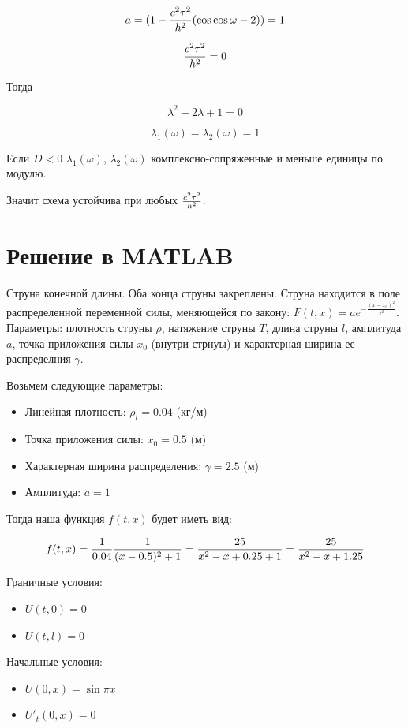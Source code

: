 \documentclass[a4paper]{article}
\begin{document}
$$a = (1-{c^2\tau^2 \over h^2}(\cos{\cos{\omega}}-2)) = 1$$

$${c^2\tau^2 \over h^2} = 0$$

Тогда

$$\lambda^2 - 2\lambda + 1 = 0$$

$$\lambda_1(\omega) = \lambda_2(\omega) = 1$$

Если $D<0$ $\lambda_1(\omega)$, $\lambda_2(\omega)$ комплексно-сопряженные и меньше единицы по модулю.

Значит схема устойчива при любых ${c^2\tau^2 \over h^2}$.

\newpage

\section{Решение в MATLAB}

Струна конечной длины. Оба конца струны закреплены. Струна находится в поле распределенной переменной силы, меняющейся по закону: $F(t, x) = ae^{-\frac{(x-x_0)^2}{\gamma^2}}$. \\
Параметры: плотность струны $\rho$, натяжение струны $T$, длина струны $l$, амплитуда $a$, точка приложения силы $x_0$ (внутри стрнуы) и характерная ширина ее распределния $\gamma$.

Возьмем следующие параметры:
\begin{itemize}
    \item Линейная плотность: $\rho_l=0.04$ (кг/м)
    \item Точка приложения силы: $x_0=0.5$ (м)
    \item Характерная ширина распределения: $\gamma=2.5$ (м)
    \item Амплитуда: $a=1$
\end{itemize}

Тогда  наша функция $f(t,x)$ будет иметь вид:

$$f(t,x)={1 \over 0.04}{1 \over (x-0.5)^2  +1}={25 \over x^2-x+0.25+1}={25 \over x^2-x+1.25}$$

Граничные условия:

\begin{itemize}
    \item $U(t,0)=0$
    \item $U(t,l)=0$
\end{itemize}

Начальные условия:

\begin{itemize}
    \item $U(0,x)=\sin{\pi x}$
    \item $U'_t(0,x)=0$
\end{itemize}
\end{document}
